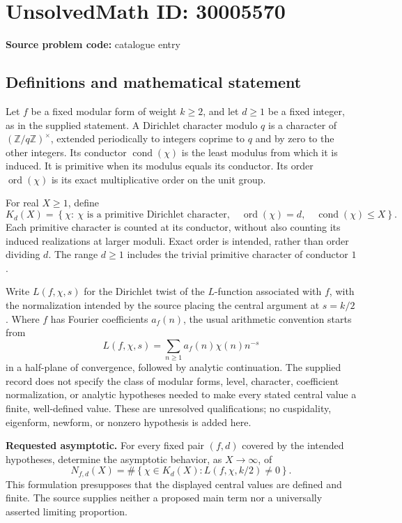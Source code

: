\documentclass[11pt]{article}
\newcommand{\Z}{\mathbb{Z}}
\begin{document}
\section*{UnsolvedMath ID: 30005570}
\textbf{Source problem code:} catalogue entry
\subsection{Definitions and mathematical statement}
Let \(f\) be a fixed modular form of weight \(k\geq 2\), and let \(d\geq 1\) be a fixed integer, as in the supplied statement. A Dirichlet character modulo \(q\) is a character of \((\Z/q\Z)^\times\), extended periodically to integers coprime to \(q\) and by zero to the other integers. Its conductor \(\operatorname{cond}(\chi)\) is the least modulus from which it is induced. It is primitive when its modulus equals its conductor. Its order \(\operatorname{ord}(\chi)\) is its exact multiplicative order on the unit group.

For real \(X\geq 1\), define
\[
K_d(X)=\left\{\chi:\ \chi\text{ is a primitive Dirichlet character},\quad \operatorname{ord}(\chi)=d,\quad \operatorname{cond}(\chi)\leq X\right\}.
\]
Each primitive character is counted at its conductor, without also counting its induced realizations at larger moduli. Exact order is intended, rather than order dividing \(d\). The range \(d\geq 1\) includes the trivial primitive character of conductor \(1\).

Write \(L(f,\chi,s)\) for the Dirichlet twist of the \(L\)-function associated with \(f\), with the normalization intended by the source placing the central argument at \(s=k/2\). Where \(f\) has Fourier coefficients \(a_f(n)\), the usual arithmetic convention starts from
\[
L(f,\chi,s)=\sum_{n\geq 1}a_f(n)\chi(n)n^{-s}
\]
in a half-plane of convergence, followed by analytic continuation. The supplied record does not specify the class of modular forms, level, character, coefficient normalization, or analytic hypotheses needed to make every stated central value a finite, well-defined value. These are unresolved qualifications; no cuspidality, eigenform, newform, or nonzero hypothesis is added here.

\textbf{Requested asymptotic.} For every fixed pair \((f,d)\) covered by the intended hypotheses, determine the asymptotic behavior, as \(X\to\infty\), of
\[
N_{f,d}(X)=\#\left\{\chi\in K_d(X):L(f,\chi,k/2)\neq 0\right\}.
\]
This formulation presupposes that the displayed central values are defined and finite. The source supplies neither a proposed main term nor a universally asserted limiting proportion.
\end{document}
